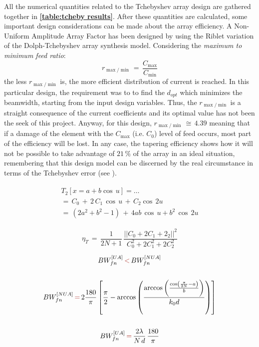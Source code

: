 \documentclass[12pt,a4paper,twocolumn]{article}
\begin{document}
{All the numerical quantities related to the Tchebyshev array design are gathered together in \textbf{\cref{table:tcheby results}}. After these quantities are calculated, some important design considerations can be made about the array efficiency. A Non-Uniform Amplitude Array Factor has been designed by using the Riblet variation of the Dolph-Tchebyshev array synthesis model. Considering the \emph{maximum to minimum feed ratio}: \[r_{\max/\min}\,=\,\frac{C_{\max}}{C_{\min}}\] 
the less $r_{\max/\min}$ is, the more efficient distribution of current is reached. In this particular design, the requirement was to to find the $d_{opt}$ which minimizes the beamwidth, starting from the input design variables. Thus, the $r_{\max/\min}$ is a straight consequence of the current coefficients and its optimal value has not been the seek of this project. Anyway, for this design, $r_{\max/\min}\,\cong\,4.39$ meaning that if a damage of the element with the $C_{\max}$ (i.e. $C_0$) level of feed occurs, most part of the efficiency will be lost. In any case, the tapering efficiency shows how it will not be possible to take advantage of $21\,\%$ of the array in an ideal situation, remembering that this design model can be discerned by the real circumstance in terms of the Tchebyshev error (see \textbf{\cite{Balanis1}}). 

\begin{equation}\begin{split}
		\begin{aligned}
			T_2\left[x=a+b\cos\,u\right]=\dots\\
			=\,C_0\,+\,2\,C_1\,\cos\,u\,+\,C_2\cos\,2u\\
			=\,(2a^2+b^2-1)\,+\,4ab\,\cos\,u+b^2\,\cos\,2u
			\label{eq:tcheby poly coeff}
		\end{aligned}
	\end{split}
\end{equation}

\begin{equation}
	\eta_T\,=\,\frac{1}{2N+1}\,\frac{||C_0+2C_1+2_2||^2}{C_0^2+2C_1^2+2C_2^2}
	\label{eq:tapering efficiency}
\end{equation}

\begin{equation}
	\begin{gathered}
		BW_{fn}^{[UA]}\,{\color{Mahogany}<}\,BW_{fn}^{[NUA]}\\
		\\
		BW_{fn}^{[NUA]}\,{\color{Mahogany}=}\,2\frac{180}{\pi}\left[\frac{\pi}{2}-\arccos\left(\frac{\arccos\left(\frac{\cos\left(\frac{\pi}{2N}-a\right)}{b}\right)}{k_0d}\right)\right]\\
		\\
		BW_{fn}^{[UA]}\,{\color{Mahogany}=}\,\frac{2\lambda}{N\,d}\,\frac{180}{\pi}
	\end{gathered}
	\label{eq:tcheby beamwidth}
\end{equation}

}
\end{document}
